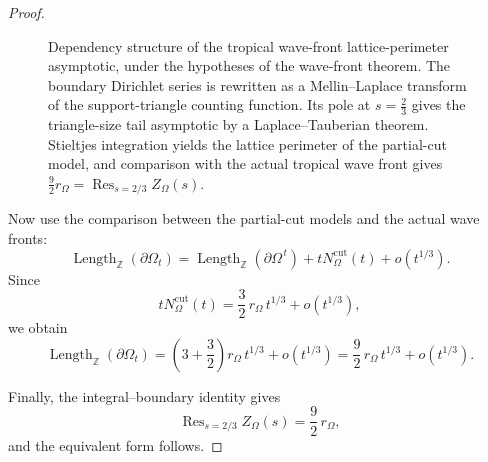 \documentclass[a4paper,american,11pt]{amsart}
\theoremstyle{plain}
\theoremstyle{definition}
\newcommand{\Z}{\mathbb Z}
\DeclareMathOperator*{\Res}{Res}
\DeclareMathOperator{\Length}{Length}
\begin{document}
\begin{proof}
\begin{figure}[p]

\vspace{2mm}

\caption{
Dependency structure of the tropical wave-front lattice-perimeter
asymptotic, under the hypotheses of the wave-front theorem.
The boundary Dirichlet series is rewritten as a Mellin--Laplace transform
of the support-triangle counting function. Its pole at \(s=\frac23\)
gives the triangle-size tail asymptotic by a Laplace--Tauberian theorem.
Stieltjes integration yields the lattice perimeter of the partial-cut model,
and comparison with the actual tropical wave front gives
\(\frac92r_\Omega=\Res_{s=2/3}Z_\Omega(s)\).
}
\label{fig:twf-tauberian-dependency}

\end{figure}

\clearpage


Now use the comparison between the partial-cut models and the actual wave
fronts:
\[
\Length_{\Z}(\partial\Omega_t)
=
\Length_{\Z}(\partial\Omega^{\,t})
+
tN^{\mathrm{cut}}_\Omega(t)
+
o(t^{1/3}).
\]
Since
\[
tN^{\mathrm{cut}}_\Omega(t)
=
\frac32\,r_\Omega\,t^{1/3}+o(t^{1/3}),
\]
we obtain
\[
\Length_{\Z}(\partial\Omega_t)
=
\left(3+\frac32\right)r_\Omega\,t^{1/3}+o(t^{1/3})
=
\frac92\,r_\Omega\,t^{1/3}+o(t^{1/3}).
\]

Finally, the integral--boundary identity gives
\[
\Res_{s=2/3}Z_\Omega(s)=\frac92\,r_\Omega,
\]
and the equivalent form follows.
\end{proof}
\end{document}
